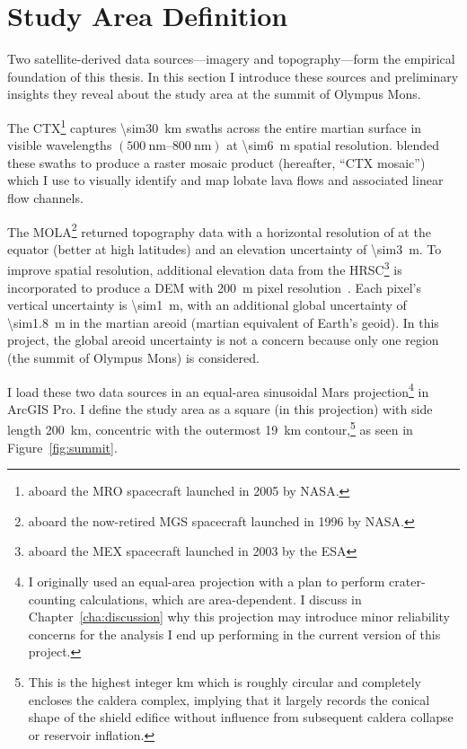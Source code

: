 \section{Study Area Definition}\label{sec:study-area}

Two satellite-derived data sources---imagery and topography---form the empirical foundation of this thesis. In this section I introduce these sources and preliminary insights they reveal about the study area at the summit of Olympus Mons.


The \acf{CTX}\footnote{aboard the \ac{MRO} spacecraft launched in 2005 by \acs{NASA}.} captures \qty{\sim30}{\km} swaths across the entire martian surface in visible wavelengths $(\qtyrange{500}{800}{\nm})$ at \qty{\sim6}{\m} spatial resolution. \textcite{Dickson2018AGB} blended these swaths to produce a raster mosaic product (hereafter, ``\ac{CTX} mosaic'') which I use to visually identify and map lobate lava flows and associated linear flow channels.

The \acf{MOLA}\footnote{aboard the now-retired \ac{MGS} spacecraft launched in 1996 by \acs{NASA}.} returned topography data with a horizontal resolution of  at the equator (better at high latitudes) and an elevation uncertainty of \qty{\sim3}{\m}. To improve spatial resolution, additional elevation data from the \ac{HRSC}\footnote{aboard the \ac{MEX} spacecraft launched in 2003 by the \ac{ESA}} is incorporated to produce a \ac{DEM} with \qty{200}{\m} pixel resolution~\parencite{smith_mars_2001}. Each pixel's vertical uncertainty is \qty{\sim1}{\m}, with an additional global uncertainty of \qty{\sim1.8}{\m} in the martian areoid (martian equivalent of Earth's geoid). In this project, the global areoid uncertainty is not a concern because only one region (the summit of Olympus Mons) is considered.

I load these two data sources in an equal-area sinusoidal Mars projection\footnote{I originally used an equal-area projection with a plan to perform crater-counting calculations, which are area-dependent. I discuss in Chapter~\ref{cha:discussion} why this projection may introduce minor reliability concerns for the analysis I end up performing in the current version of this project.} in ArcGIS Pro. I define the study area as a square (in this projection) with side length \qty{200}{\km}, concentric with the outermost \qty{19}{\km} contour,\footnote{This is the highest integer \unit{km} which is roughly circular and completely encloses the caldera complex, implying that it largely records the conical shape of the shield edifice without influence from subsequent caldera collapse or reservoir inflation.} as seen in Figure~\ref{fig:summit}.

